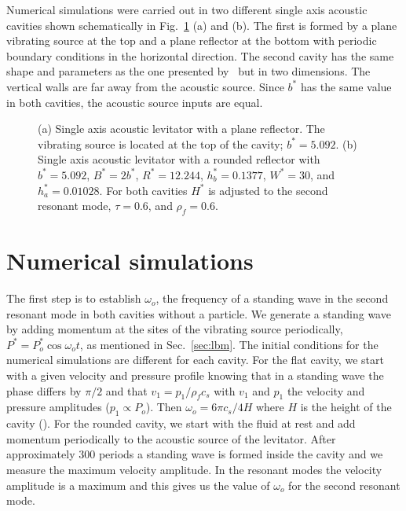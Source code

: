 Numerical simulations were carried out in two different single axis acoustic cavities
shown schematically in Fig.~\ref{fig:cavities} (a) and (b). The first is formed by a plane
vibrating source at the top and a plane reflector at the bottom with periodic boundary
conditions in the horizontal direction. The second cavity has
the same shape and parameters as the one presented by~\cite{xie01} but in two dimensions.
The vertical walls are far away from the acoustic source. 
Since $b^\ast$ has the same value in both cavities, the acoustic source inputs are
equal.
%
\begin{figure}

\caption{\label{fig:cavities}
 (a) Single axis acoustic levitator with a plane reflector. The vibrating source is located
 at the top of the cavity; $b^\ast= 5.092$. (b) Single axis acoustic
 levitator with a rounded reflector with $b^\ast=5.092$, $B^\ast=2b^\ast$, $R^\ast=12.244$,
 $h_b^\ast =0.1377$, $W^\ast = 30$, and $h_a^\ast=0.01028$. For both cavities $H^\ast$ is
 adjusted to the second resonant mode, $\tau=0.6$, and $\rho_f=0.6$.}
\end{figure}


\section{\label{sec:experiments} Numerical simulations}

The first step is to establish $\omega_o$, the frequency of a standing wave in the second 
resonant mode in both cavities without a particle. We generate a standing wave 
by adding momentum at the sites of the vibrating source periodically, 
$P^\ast=P_o^\ast\cos\omega_o t$, as mentioned in Sec.~\ref{sec:lbm}. The initial conditions 
for the numerical simulations are different for each cavity. For the flat cavity, we start  
with a given velocity and pressure profile knowing that in a standing wave the phase 
differs by $\pi/2$ and that $v_1=p_1/\rho_fc_s$ with $v_1$ and $p_1$ 
the velocity and pressure amplitudes ($p_1\propto P_o$). Then $\omega_o=6\pi c_s/4H$ where 
$H$ is the height of the cavity (\cite{strutt}). For the rounded cavity, 
we start with the fluid at rest and add momentum periodically to the acoustic source 
of the levitator. After approximately $300$ periods a standing wave is formed inside the 
cavity and we measure the maximum velocity amplitude. In the resonant modes the 
velocity amplitude is a maximum and this gives us the value of $\omega_o$ for the second 
resonant mode. 
 
